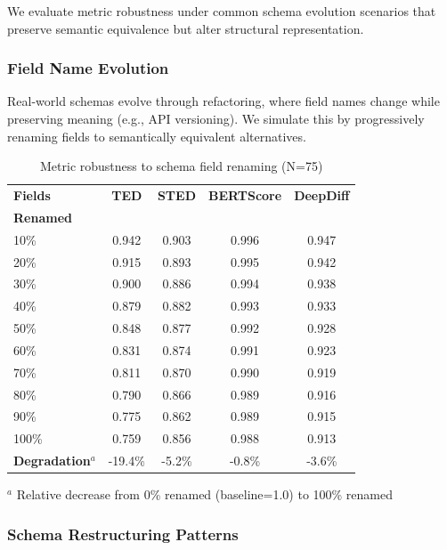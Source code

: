 \documentclass{article}
\begin{document}
We evaluate metric robustness under common schema evolution scenarios that preserve semantic equivalence but alter structural representation.

\subsubsection{Field Name Evolution}

Real-world schemas evolve through refactoring, where field names change while preserving meaning (e.g., API versioning). We simulate this by progressively renaming fields to semantically equivalent alternatives.

\begin{table}[H]
\centering
\caption{Metric robustness to schema field renaming (N=75)}
\label{tab:field-name-robustness}
\begin{tabular}{lcccc}
\toprule
\textbf{Fields} & \textbf{TED} & \textbf{STED} & \textbf{BERTScore} & \textbf{DeepDiff} \\
\textbf{Renamed} & & & & \\
\midrule
10\% & 0.942 & 0.903 & 0.996 & 0.947 \\
20\% & 0.915 & 0.893 & 0.995 & 0.942 \\
30\% & 0.900 & 0.886 & 0.994 & 0.938 \\
40\% & 0.879 & 0.882 & 0.993 & 0.933 \\
50\% & 0.848 & 0.877 & 0.992 & 0.928 \\
60\% & 0.831 & 0.874 & 0.991 & 0.923 \\
70\% & 0.811 & 0.870 & 0.990 & 0.919 \\
80\% & 0.790 & 0.866 & 0.989 & 0.916 \\
90\% & 0.775 & 0.862 & 0.989 & 0.915 \\
100\% & 0.759 & 0.856 & 0.988 & 0.913 \\
\midrule
\textbf{Degradation}$^a$ & -19.4\% & -5.2\% & -0.8\% & -3.6\% \\
\bottomrule
\end{tabular}
\vspace{-2mm}
\begin{flushleft}
\small $^a$ Relative decrease from 0\% renamed (baseline=1.0) to 100\% renamed
\end{flushleft}
\end{table}

\subsubsection{Schema Restructuring Patterns}
\end{document}
